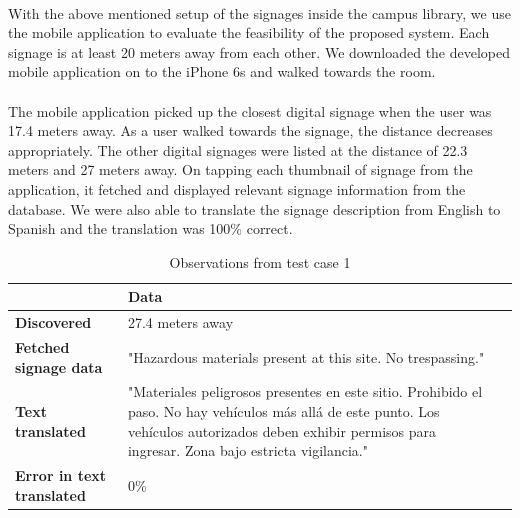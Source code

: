 \documentclass[12pt]{article}
\begin{document}
\paragraph{}With the above mentioned setup of the signages inside the campus library, we use the mobile application to evaluate the feasibility of the proposed system. Each signage is at least 20 meters away from each other. We downloaded the developed mobile application on to the iPhone 6s and walked towards the room.

\paragraph{}The mobile application picked up the closest digital signage when the user was 17.4 meters away. As a user walked towards the signage, the distance decreases appropriately. The other digital signages were listed at the distance of 22.3 meters and 27 meters away. On tapping each thumbnail of signage from the application, it fetched and displayed relevant signage information from the database. We were also able to translate the signage description from English to Spanish and the translation was 100\% correct.

\begin{table}%
    \centering
  
    \label{my-label}
       \begin{tabular}{|p{30mm}|p{55mm}|p{35mm}|}
 \hline
  & \textbf{Data}  \\ [0.5ex] 
 \hline\hline
 \textbf{Discovered} & 27.4 meters away  \\ 
 \hline
 \textbf{Fetched signage data} & "Hazardous materials present at this site. No trespassing."  \\
 \hline
 \textbf{Text translated} &  "Materiales peligrosos presentes en este sitio. Prohibido el paso. No hay vehículos más allá de este punto. Los vehículos autorizados deben exhibir permisos para ingresar. Zona bajo estricta vigilancia." \\
 \hline
 \textbf{Error in text translated} & 0\%   \\ [1ex] 
 \hline
    \end{tabular}
      \caption{Observations from test case 1}
\end{table}
\end{document}
